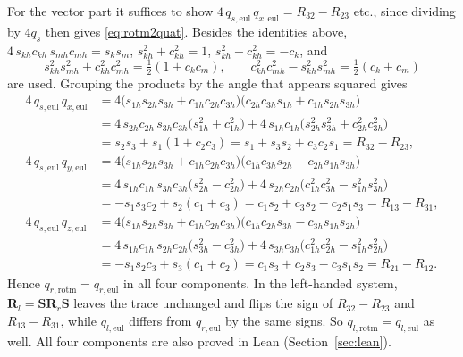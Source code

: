 \documentclass{article}
\theoremstyle{plain}
\theoremstyle{definition}
\newcommand{\vect}[1]{\boldsymbol{#1}}
\begin{document}
For the vector part it suffices to show $4\,q_{s,\mathrm{eul}}\,q_{x,\mathrm{eul}} = R_{32} - R_{23}$
etc., since dividing by $4q_s$ then gives \eqref{eq:rotm2quat}. Besides the identities above,
$4\,s_{kh}c_{kh}\,s_{mh}c_{mh} = s_k s_m$, $s_{kh}^2 + c_{kh}^2 = 1$, $s_{kh}^2 - c_{kh}^2 = -c_k$,
and
\begin{equation}
  s_{kh}^2 s_{mh}^2 + c_{kh}^2 c_{mh}^2 = \tfrac12 (1 + c_k c_m), \qquad
  c_{kh}^2 c_{mh}^2 - s_{kh}^2 s_{mh}^2 = \tfrac12 (c_k + c_m)
\end{equation}
are used. Grouping the products by the angle that appears squared gives
\begin{align}
  4\,q_{s,\mathrm{eul}}\,q_{x,\mathrm{eul}}
  &= 4\bigl(s_{1h}s_{2h}s_{3h} + c_{1h}c_{2h}c_{3h}\bigr)\bigl(c_{2h}c_{3h}s_{1h} + c_{1h}s_{2h}s_{3h}\bigr) \nonumber\\
  &= 4\, s_{2h}c_{2h}\, s_{3h}c_{3h} \bigl(s_{1h}^2 + c_{1h}^2\bigr)
   + 4\, s_{1h}c_{1h} \bigl(s_{2h}^2 s_{3h}^2 + c_{2h}^2 c_{3h}^2\bigr) \nonumber\\
  &= s_2 s_3 + s_1 (1 + c_2 c_3)
   = s_1 + s_3s_2 + c_3c_2s_1 = R_{32} - R_{23}, \\[4pt]
  4\,q_{s,\mathrm{eul}}\,q_{y,\mathrm{eul}}
  &= 4\bigl(s_{1h}s_{2h}s_{3h} + c_{1h}c_{2h}c_{3h}\bigr)\bigl(c_{1h}c_{3h}s_{2h} - c_{2h}s_{1h}s_{3h}\bigr) \nonumber\\
  &= 4\, s_{1h}c_{1h}\, s_{3h}c_{3h} \bigl(s_{2h}^2 - c_{2h}^2\bigr)
   + 4\, s_{2h}c_{2h} \bigl(c_{1h}^2 c_{3h}^2 - s_{1h}^2 s_{3h}^2\bigr) \nonumber\\
  &= -s_1 s_3 c_2 + s_2 (c_1 + c_3)
   = c_1s_2 + c_3s_2 - c_2s_1s_3 = R_{13} - R_{31}, \\[4pt]
  4\,q_{s,\mathrm{eul}}\,q_{z,\mathrm{eul}}
  &= 4\bigl(s_{1h}s_{2h}s_{3h} + c_{1h}c_{2h}c_{3h}\bigr)\bigl(c_{1h}c_{2h}s_{3h} - c_{3h}s_{1h}s_{2h}\bigr) \nonumber\\
  &= 4\, s_{1h}c_{1h}\, s_{2h}c_{2h} \bigl(s_{3h}^2 - c_{3h}^2\bigr)
   + 4\, s_{3h}c_{3h} \bigl(c_{1h}^2 c_{2h}^2 - s_{1h}^2 s_{2h}^2\bigr) \nonumber\\
  &= -s_1 s_2 c_3 + s_3 (c_1 + c_2)
   = c_1s_3 + c_2s_3 - c_3s_1s_2 = R_{21} - R_{12}.
\end{align}
Hence $q_{r,\mathrm{rotm}} = q_{r,\mathrm{eul}}$ in all four components. In the left-handed system,
$\vect R_l = \vect S\vect R_r\vect S$ leaves the trace unchanged and flips the sign of
$R_{32} - R_{23}$ and $R_{13} - R_{31}$, while $q_{l,\mathrm{eul}}$ differs from $q_{r,\mathrm{eul}}$
by the same signs. So $q_{l,\mathrm{rotm}} = q_{l,\mathrm{eul}}$ as well. All four components are
also proved in Lean (Section~\ref{sec:lean}).
\end{document}
